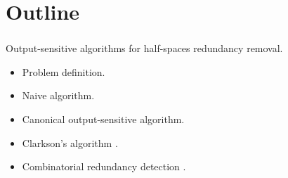 \section{Outline}
\begin{frame}\frametitle{\insertsection}\justifying
Output-sensitive algorithms for half-spaces redundancy removal.\pause
\vspace{1cm}

\begin{itemize}[label={\color{prussianblue}$\bullet$},itemsep=6pt]
\item Problem definition.\pause
\item Naive algorithm.\pause
\item Canonical output-sensitive algorithm.\pause
\item Clarkson's algorithm \cite{clarkson:1994}.\pause
\item Combinatorial redundancy detection \cite{fukuda:2014}.
\end{itemize}
\end{frame}
